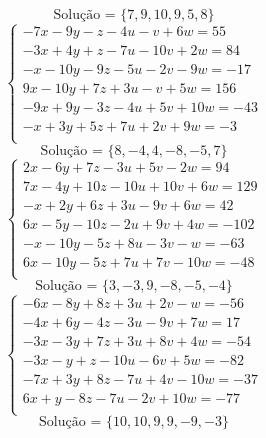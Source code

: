 \documentclass[12pt,oneside,a4paper]{article}
\begin{document}
\begin{equation*}
\text{Solução = }\{7,9,10,9,5,8\}
\end{equation*}
\vspace{\baselineskip}
\begin{equation*}
\begin{cases}
-7x-9y-z-4u-v+6w=55 \\
-3x+4y+z-7u-10v+2w=84 \\
-x-10y-9z-5u-2v-9w=-17 \\
9x-10y+7z+3u-v+5w=156 \\
-9x+9y-3z-4u+5v+10w=-43 \\
-x+3y+5z+7u+2v+9w=-3 \\
\end{cases}
\end{equation*}
\begin{equation*}
\text{Solução = }\{8,-4,4,-8,-5,7\}
\end{equation*}
\vspace{\baselineskip}
\begin{equation*}
\begin{cases}
2x-6y+7z-3u+5v-2w=94 \\
7x-4y+10z-10u+10v+6w=129 \\
-x+2y+6z+3u-9v+6w=42 \\
6x-5y-10z-2u+9v+4w=-102 \\
-x-10y-5z+8u-3v-w=-63 \\
6x-10y-5z+7u+7v-10w=-48 \\
\end{cases}
\end{equation*}
\begin{equation*}
\text{Solução = }\{3,-3,9,-8,-5,-4\}
\end{equation*}
\vspace{\baselineskip}
\begin{equation*}
\begin{cases}
-6x-8y+8z+3u+2v-w=-56 \\
-4x+6y-4z-3u-9v+7w=17 \\
-3x-3y+7z+3u+8v+4w=-54 \\
-3x-y+z-10u-6v+5w=-82 \\
-7x+3y+8z-7u+4v-10w=-37 \\
6x+y-8z-7u-2v+10w=-77 \\
\end{cases}
\end{equation*}
\begin{equation*}
\text{Solução = }\{10,10,9,9,-9,-3\}
\end{equation*}
\end{document}
